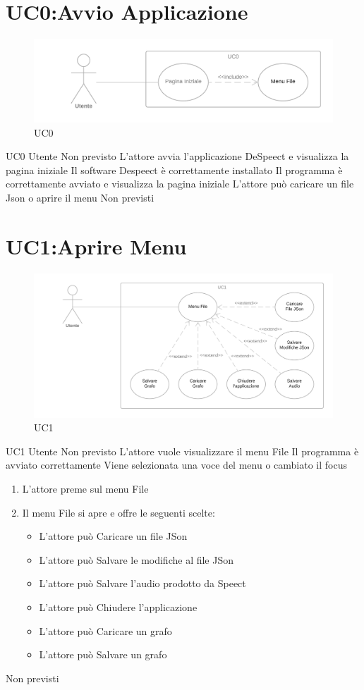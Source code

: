 \documentclass[../AnalisideiRequisiti.tex]{subfiles}
\begin{document}
	\section{UC0:Avvio Applicazione}
	\begin{figure}[H]
		\caption{UC0}
		\centering
		\includegraphics[width=\textwidth]{../img/UC00.png}
	\end{figure}
	\UserCase
	{UC0}
	{Utente}
	{Non previsto}
	{L'attore avvia l'applicazione DeSpeect e visualizza la pagina iniziale}
	{Il software Despeect è correttamente installato}
	{Il programma è correttamente avviato e visualizza la pagina iniziale}
	{L'attore può caricare un file Json o aprire il menu }
	{Non previsti}
	\section{UC1:Aprire Menu}
	\begin{figure}[H]
	\caption{UC1}
	\centering
	\includegraphics[width=\textwidth]{../img/UC01.png}
	\end{figure}
	\UserCase
	{UC1}
	{Utente}
	{Non previsto}
	{L'attore vuole visualizzare il menu File}
	{Il programma è avviato correttamente }
	{Viene selezionata una voce del menu o cambiato il focus}
	{	\begin{enumerate}
			\item{} L'attore preme sul menu File
			\item{} Il menu File si apre e offre le seguenti scelte:
		\begin{itemize}
		\item{} L'attore può Caricare un file JSon 
		\item{} L'attore può Salvare le modifiche al file JSon 
		\item{} L'attore può Salvare l'audio prodotto da Speect 
		\item{} L'attore può Chiudere l'applicazione 
		\item{} L'attore può Caricare un grafo 
		\item{} L'attore può Salvare un grafo 
		\end{itemize}
	\end{enumerate}
	}
	{Non previsti}
\end{document}
